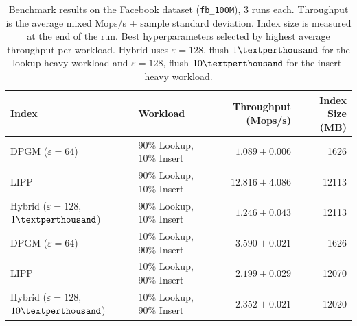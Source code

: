 \begin{table}[h]
\centering
\caption{Benchmark results on the Facebook dataset (\texttt{fb\_100M}), 3 runs each.
  Throughput is the average mixed Mops/s $\pm$ sample standard deviation.
  Index size is measured at the end of the run.
  Best hyperparameters selected by highest average throughput per workload.
  Hybrid uses $\varepsilon{=}128$, flush $1\permil$ for the lookup-heavy workload
  and $\varepsilon{=}128$, flush $10\permil$ for the insert-heavy workload.}
\label{tab:results}
\smallskip
\begin{tabular}{llrr}
\toprule
\textbf{Index} & \textbf{Workload} & \textbf{Throughput (Mops/s)} & \textbf{Index Size (MB)} \\
\midrule
DPGM ($\varepsilon{=}64$) & 90\% Lookup, 10\% Insert & $1.089 \pm 0.006$ & 1626 \\
LIPP & 90\% Lookup, 10\% Insert & \textbf{$12.816 \pm 4.086$} & 12113 \\
Hybrid ($\varepsilon{=}128$, $1\permil$) & 90\% Lookup, 10\% Insert & $1.246 \pm 0.043$ & 12113 \\
\midrule
DPGM ($\varepsilon{=}64$) & 10\% Lookup, 90\% Insert & \textbf{$3.590 \pm 0.021$} & 1626 \\
LIPP & 10\% Lookup, 90\% Insert & $2.199 \pm 0.029$ & 12070 \\
Hybrid ($\varepsilon{=}128$, $10\permil$) & 10\% Lookup, 90\% Insert & $2.352 \pm 0.021$ & 12020 \\
\bottomrule
\end{tabular}
\end{table}
